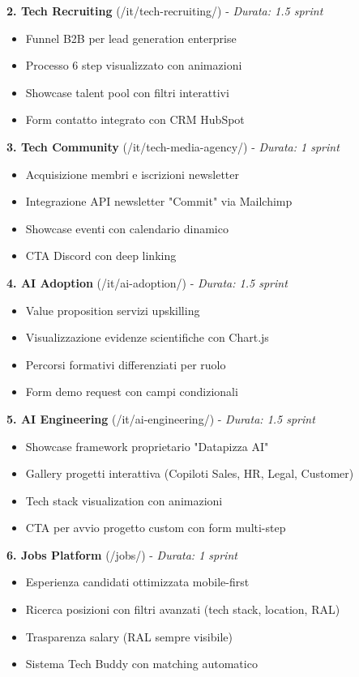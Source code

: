 \textbf{2. Tech Recruiting} (/it/tech-recruiting/) - \textit{Durata: 1.5 sprint}
\begin{itemize}
  \item Funnel B2B per lead generation enterprise
  \item Processo 6 step visualizzato con animazioni
  \item Showcase talent pool con filtri interattivi
  \item Form contatto integrato con CRM HubSpot
\end{itemize}

\textbf{3. Tech Community} (/it/tech-media-agency/) - \textit{Durata: 1 sprint}
\begin{itemize}
  \item Acquisizione membri e iscrizioni newsletter
  \item Integrazione API newsletter "Commit" via Mailchimp
  \item Showcase eventi con calendario dinamico
  \item CTA Discord con deep linking
\end{itemize}

\textbf{4. AI Adoption} (/it/ai-adoption/) - \textit{Durata: 1.5 sprint}
\begin{itemize}
  \item Value proposition servizi upskilling
  \item Visualizzazione evidenze scientifiche con Chart.js
  \item Percorsi formativi differenziati per ruolo
  \item Form demo request con campi condizionali
\end{itemize}

\textbf{5. AI Engineering} (/it/ai-engineering/) - \textit{Durata: 1.5 sprint}
\begin{itemize}
  \item Showcase framework proprietario "Datapizza AI"
  \item Gallery progetti interattiva (Copiloti Sales, HR, Legal, Customer)
  \item Tech stack visualization con animazioni
  \item CTA per avvio progetto custom con form multi-step
\end{itemize}

\textbf{6. Jobs Platform} (/jobs/) - \textit{Durata: 1 sprint}
\begin{itemize}
  \item Esperienza candidati ottimizzata mobile-first
  \item Ricerca posizioni con filtri avanzati (tech stack, location, RAL)
  \item Trasparenza salary (RAL sempre visibile)
  \item Sistema Tech Buddy con matching automatico
\end{itemize}

